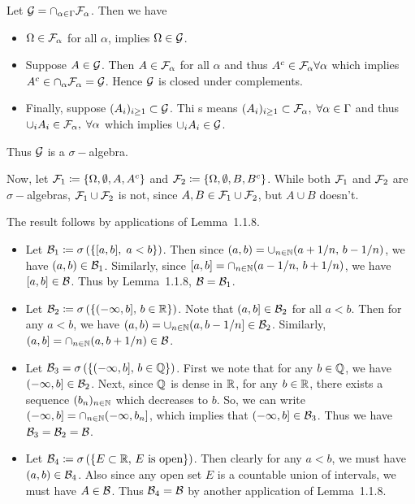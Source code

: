 Let $\mathcal{G} = \cap_{\alpha \in \Gamma} \mathcal{F}_\alpha$. Then we have 
\begin{itemize}
    \item $\Omega \in \mathcal{F}_\alpha$ for all $\alpha$, implies $\Omega \in \mathcal{G}$. 
    \item Suppose $A \in \mathcal{G}$. Then $A\in \mathcal{F}_\alpha$ for all $\alpha$ and thus $A^c \in \mathcal{F}_\alpha \forall \alpha$ which implies $A^c \in \cap_\alpha \mathcal{F}_\alpha = \mathcal{G}$. Hence $\mathcal{G}$ is closed under complements. 
    \item Finally, suppose $(A_i)_{i \geq 1} \subset \mathcal{G}$. Thi s means $(A_i)_{i \geq 1} \subset \mathcal{F}_\alpha, \; \forall \alpha \in \Gamma$ and thus $\cup_i A_i \in \mathcal{F}_\alpha, \; \forall \alpha$ which implies $\cup_i A_i \in \mathcal{G}$. 
\end{itemize}
Thus $\mathcal{G}$ is a $\sigma-$algebra. 

Now, let $\mathcal{F}_1 \coloneqq \{\Omega, \emptyset, A, A^c\}$ and $\mathcal{F}_2 \coloneqq \{ \Omega, \emptyset, B, B^c\}$. While both $\mathcal{F}_1$ and $\mathcal{F}_2$ are $\sigma-$algebras, $\mathcal{F}_1 \cup \mathcal{F}_2$ is not, since $A, B \in \mathcal{F}_1 \cup \mathcal{F}_2$, but $A\cup B$ doesn't. 


 The result follows by applications of Lemma~1.1.8. 
\begin{itemize}
    \item Let $\mathcal{B}_1 \coloneqq \sigma \left ( \{ [a, b],\; a<b \}\right )$. Then since $(a,b) = \cup_{n\in \mathbb{N}} (a+1/n,\, b-1/n)$, we have $(a,b) \in \mathcal{B}_1$. Similarly, since $[a,b] = \cap_{n\in \mathbb{N}} (a-1/n,\, b+1/n)$, we have $[a,b] \in \mathcal{B}$. Thus by Lemma~1.1.8, $\mathcal{B} = \mathcal{B}_1$. 
    
    \item Let $\mathcal{B}_2 \coloneqq \sigma\left ( \{ (-\infty, b], \, b \in \mathbb{R}\}\right )$. Note that $(a, b] \in \mathcal{B}_2$ for all $a<b$. Then for any $a<b$, we have $(a,b) = \cup_{n \in \mathbb{N}} (a, b-1/n] \in \mathcal{B}_2$. Similarly, $(a,b] = \cap_{n \in \mathbb{N}} (a, b+1/n) \in \mathcal{B}$. 
    
    \item Let $\mathcal{B}_3= \sigma \left ( \{ (-\infty, b], \, b \in \mathbb{Q} \}\right )$. First we note that for any $b \in \mathbb{Q}$, we have $(-\infty, b] \in \mathcal{B}_2$. Next, since $\mathbb{Q}$ is dense in $\mathbb{R}$, for any $b\in \mathbb{R}$, there exists a sequence $(b_n)_{n\in \mathbb{N}}$ which decreases to $b$. So,  we can write $(-\infty, b] = \cap_{n \in \mathbb{N}} (-\infty, b_n ]$, which implies that $(-\infty, b] \in \mathcal{B}_3$. Thus we have $\mathcal{B}_3= \mathcal{B}_2 = \mathcal{B}$. 
    
    \item Let $\mathcal{B}_4 \coloneqq \sigma \left ( \{ E\subset \mathbb{R},\, E \text{ is open}\}\right )$. Then clearly for any $a<b$, we must have $(a,b) \in \mathcal{B}_4$. Also since any open set $E$ is a countable union of intervals, we must have $A \in \mathcal{B}$. Thus $\mathcal{B}_4 = \mathcal{B}$ by another application of Lemma~1.1.8.
\end{itemize}



